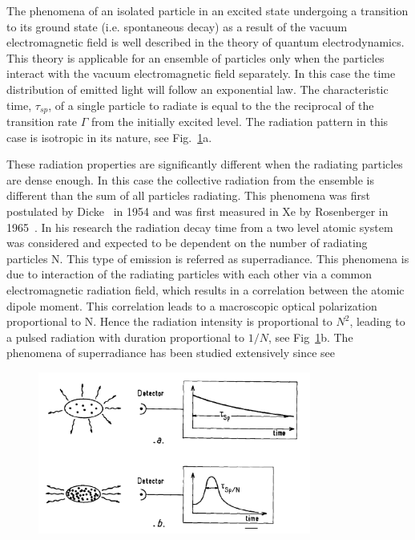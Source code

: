 The phenomena of an isolated particle in an excited state undergoing a transition to its ground state (i.e. spontaneous decay) as a result of the vacuum electromagnetic field  is well described in the theory of quantum electrodynamics. This theory is applicable for an ensemble of particles only when the particles interact with the vacuum electromagnetic field separately. In this case the time distribution of emitted light will follow an exponential law. The characteristic time, $\tau_{sp}$, of a single particle to radiate is equal to the the reciprocal of the transition rate $\Gamma$ from the initially excited level. The radiation pattern in this case is isotropic in its nature, see Fig.~\ref{fig:emissionType}a. 

These radiation properties are significantly different when the radiating particles are dense enough. In this case the collective radiation from  the ensemble is different than the sum of all particles radiating. This phenomena was first postulated by Dicke~\cite{DickeSR} in 1954 and was first measured in Xe by Rosenberger in 1965~\cite{FirstMeasure}. In his research the radiation decay time from a two level atomic system was considered and expected to be dependent on the number of radiating particles N. This type of emission is referred as superradiance. This phenomena is due to interaction of the radiating particles with each other via a common electromagnetic radiation field, which results in a correlation between the atomic dipole moment. This correlation leads to a macroscopic optical polarization proportional to N. Hence the radiation intensity is proportional to $N^2$, leading to a pulsed radiation with duration proportional to $1/N$, see Fig~\ref{fig:emissionType}b. The phenomena of superradiance has been studied extensively since see~\cite{Gross1982301,benedict1996super}  
\begin{figure}[t!]
	\centering
	\includegraphics[width=0.8\textwidth]{figs/emissionTypes.png}
	\label{fig:emissionType}
\end{figure}


